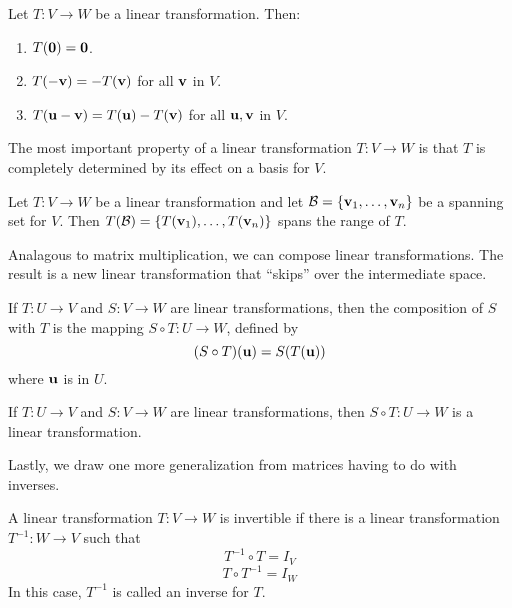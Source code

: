 \documentclass[../m73main.tex]{subfiles}
\begin{document}
\begin{theorem}
	Let $T : V \to W$ be a linear transformation.
	Then:
	\begin{enumerate}[label=(\alph*)]
		\item $T(\mathbf{0}) = \mathbf{0}$.
		\item $T(-\mathbf{v}) = -T(\mathbf{v})$ for all $\mathbf{v}$ in $V$.
		\item $T(\mathbf{u} - \mathbf{v}) = T(\mathbf{u}) - T(\mathbf{v})$ for all $\mathbf{u}, \mathbf{v}$ in $V$.
	\end{enumerate}
\end{theorem}

The most important property of a linear transformation $T : V \to W$ is that $T$ is completely determined by its effect on a basis for $V$.

\begin{theorem}
	Let $T : V \to W$ be a linear transformation and let $\mathcal{B} = \{\mathbf{v}_1, \ldots, \mathbf{v}_n\}$ be a spanning set for $V$.
	Then $T(\mathcal{B}) = \{T(\mathbf{v}_1), \ldots, T(\mathbf{v}_n)\}$ spans the range of $T$.
\end{theorem}

Analagous to matrix multiplication, we can compose linear transformations.
The result is a new linear transformation that ``skips'' over the intermediate space.

\begin{definition}
	If $T : U \to V$ and $S : V \to W$ are linear transformations, then the composition of $S$ with $T$ is the mapping $S \circ T : U \to W$, defined by
	\[ (S \circ T)(\mathbf{u}) = S(T(\mathbf{u})) \]
	where $\mathbf{u}$ is in $U$.
\end{definition}

\begin{theorem}
	If $T : U \to V$ and $S : V \to W$ are linear transformations, then $S \circ T : U \to W$ is a linear transformation.
\end{theorem}

Lastly, we draw one more generalization from matrices having to do with inverses.

\begin{definition}
	A linear transformation $T : V \to W$ is invertible if there is a linear transformation $T^{-1} : W \to V$ such that
	\[ T^{-1} \circ T = I_V \]
	\[ T \circ T^{-1} = I_W \]
	In this case, $T^{-1}$ is called an inverse for $T$.
\end{definition}
\end{document}

